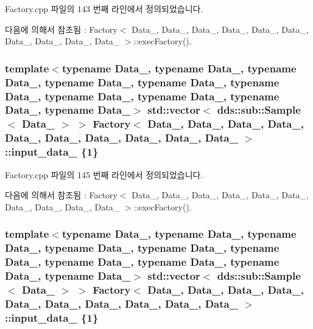 Factory.\+cpp 파일의 143 번째 라인에서 정의되었습니다.



다음에 의해서 참조됨 \+:  Factory$<$ Data\+\_, Data\+\_, Data\+\_, Data\+\_, Data\+\_, Data\+\_, Data\+\_, Data\+\_, Data\+\_, Data\+\_ $>$\+::exec\+Factory().

\subsubsection[{\texorpdfstring{input\+\_\+data\+\_\+4}{input_data_4}}]{\setlength{\rightskip}{0pt plus 5cm}template$<$typename Data\+\_, typename Data\+\_, typename Data\+\_, typename Data\+\_, typename Data\+\_, typename Data\+\_, typename Data\+\_, typename Data\+\_, typename Data\+\_, typename Data\+\_$>$ std\+::vector$<$ dds\+::sub\+::\+Sample$<$ Data\+\_ $>$ $>$ {\bf Factory}$<$ Data\+\_, Data\+\_, Data\+\_, Data\+\_, Data\+\_, Data\+\_, Data\+\_, Data\+\_, Data\+\_, Data\+\_ $>$\+::input\+\_\+data\+\_ \{1\}}\hypertarget{classFactory_a4bad31e0b189b22dfc4c1127b06040e0}{}\label{classFactory_a4bad31e0b189b22dfc4c1127b06040e0}


Factory.\+cpp 파일의 145 번째 라인에서 정의되었습니다.



다음에 의해서 참조됨 \+:  Factory$<$ Data\+\_, Data\+\_, Data\+\_, Data\+\_, Data\+\_, Data\+\_, Data\+\_, Data\+\_, Data\+\_, Data\+\_ $>$\+::exec\+Factory().

\subsubsection[{\texorpdfstring{input\+\_\+data\+\_\+5}{input_data_5}}]{\setlength{\rightskip}{0pt plus 5cm}template$<$typename Data\+\_, typename Data\+\_, typename Data\+\_, typename Data\+\_, typename Data\+\_, typename Data\+\_, typename Data\+\_, typename Data\+\_, typename Data\+\_, typename Data\+\_$>$ std\+::vector$<$ dds\+::sub\+::\+Sample$<$ Data\+\_ $>$ $>$ {\bf Factory}$<$ Data\+\_, Data\+\_, Data\+\_, Data\+\_, Data\+\_, Data\+\_, Data\+\_, Data\+\_, Data\+\_, Data\+\_ $>$\+::input\+\_\+data\+\_ \{1\}}\hypertarget{classFactory_a6aa6f19a951657809ad1663af4597670}{}\label{classFactory_a6aa6f19a951657809ad1663af4597670}



